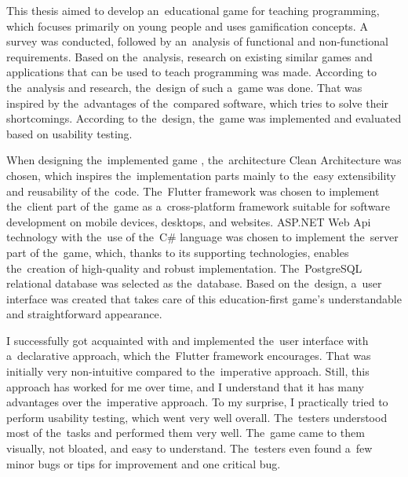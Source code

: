 \begin{conclusion}

This thesis aimed to develop an~educational game for teaching programming, which focuses primarily on young people and uses gamification concepts.
A survey was conducted, followed by an~analysis of functional and non-functional requirements.
Based on the~analysis, research on existing similar games and applications that can be used to teach programming was made.
According to the~analysis and research, the~design of such a~game was done.
That was inspired by the~advantages of the~compared software, which tries to solve their shortcomings.
According to the~design, the~game was implemented and evaluated based on usability testing.

When designing the~implemented game \myAppName{}, the~architecture Clean Architecture was chosen, which inspires the~implementation parts mainly to the~easy extensibility and reusability of the~code.
The~Flutter framework was chosen to implement the~client part of the~game as a~cross-platform framework suitable for software development on mobile devices, desktops, and websites.
ASP.NET Web Api technology with the~use of the~C\# language was chosen to implement the~server part of the~game, which, thanks to its supporting technologies, enables the~creation of high-quality and robust implementation.
The~PostgreSQL relational database was selected as the~database.
Based on the~design, a~user interface was created that takes care of this education-first game's understandable and straightforward appearance.


I successfully got acquainted with and implemented the~user interface with a~declarative approach, which the~Flutter framework encourages.
That was initially very non-intuitive compared to the~imperative approach.
Still, this approach has worked for me over time, and I understand that it has many advantages over the~imperative approach.
To my surprise, I practically tried to perform usability testing, which went very well overall.
The~testers understood most of the~tasks and performed them very well.
The~game came to them visually, not bloated, and easy to understand.
The~testers even found a~few minor bugs or tips for improvement and one critical bug.


\end{conclusion}
